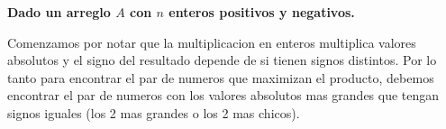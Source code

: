\textbf{Dado un arreglo $A$ con $n$ enteros positivos y negativos.}\vspace{.2cm}

Comenzamos por notar que la multiplicacion en enteros multiplica valores absolutos y el signo del resultado depende de si tienen signos distintos. Por lo tanto para encontrar el par de numeros que maximizan el producto, debemos encontrar el par de numeros con los valores absolutos mas grandes que tengan signos iguales (los 2 mas grandes o los 2 mas chicos). \vspace{.2cm}